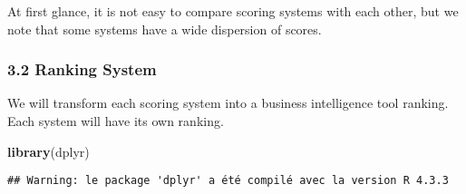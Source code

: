 \documentclass[
]{article}
\newenvironment{Shaded}{\begin{snugshade}}{\end{snugshade}}
\newcommand{\FunctionTok}[1]{\textcolor[rgb]{0.13,0.29,0.53}{\textbf{#1}}}
\newcommand{\NormalTok}[1]{#1}
\begin{document}
At first glance, it is not easy to compare scoring systems with each
other, but we note that some systems have a wide dispersion of scores.

\subsubsection{3.2 Ranking System}\label{ranking-system}

We will transform each scoring system into a business intelligence tool
ranking. Each system will have its own ranking.

\begin{Shaded}
\begin{Highlighting}[]
\FunctionTok{library}\NormalTok{(dplyr)}
\end{Highlighting}
\end{Shaded}

\begin{verbatim}
## Warning: le package 'dplyr' a été compilé avec la version R 4.3.3
\end{verbatim}
\end{document}
